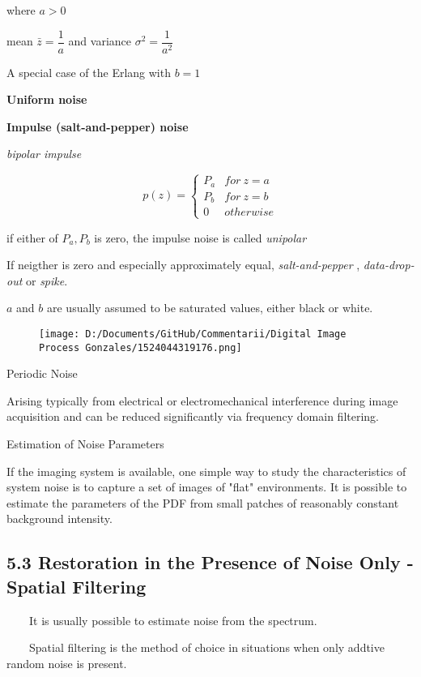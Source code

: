 \documentclass[]{article}
\begin{document}
where \(a>0\)

mean \(\bar{z}=\dfrac{1}{a}\) and variance \(\sigma^2=\dfrac{1}{a^2}\)

A special case of the Erlang with \(b=1\)

\textbf{Uniform noise}

\textbf{Impulse (salt-and-pepper) noise}

\emph{bipolar impulse}

\[p(z)=\begin{cases}P_a & for\ z=a\\P_b & for\ z=b\\ 0 & otherwise\end{cases}\]

if either of \(P_a, P_b\) is zero, the impulse noise is called
\emph{unipolar}

If neigther is zero and especially approximately equal,
\emph{salt-and-pepper} , \emph{data-drop-out} or \emph{spike}.

\(a\) and \(b\) are usually assumed to be saturated values, either black
or white.

\begin{figure}
\centering
\texttt{[image: D:/Documents/GitHub/Commentarii/Digital Image Process Gonzales/1524044319176.png]}
\caption{}
\end{figure}

Periodic Noise

Arising typically from electrical or electromechanical interference
during image acquisition and can be reduced significantly via frequency
domain filtering.

Estimation of Noise Parameters

If the imaging system is available, one simple way to study the
characteristics of system noise is to capture a set of images of "flat"
environments. It is possible to estimate the parameters of the PDF from
small patches of reasonably constant background intensity.

\subsection{5.3 Restoration in the Presence of Noise Only - Spatial
Filtering}\label{header-n673}

\(\quad\quad\)It is usually possible to estimate noise from the
spectrum.

\(\quad\quad\)Spatial filtering is the method of choice in situations
when only addtive random noise is present.
\end{document}
